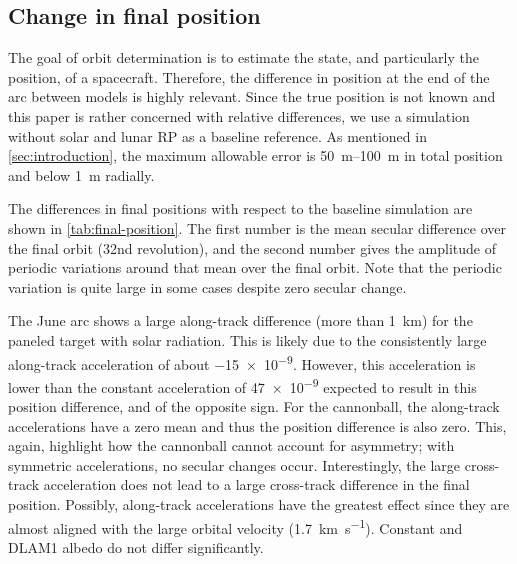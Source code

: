 \subsection{Change in final position}
The goal of orbit determination is to estimate the state, and particularly the position, of a spacecraft. Therefore, the difference in position at the end of the arc between models is highly relevant. Since the true position is not known and this paper is rather concerned with relative differences, we use a simulation without solar and lunar \gls{RP} as a baseline reference. As mentioned in \cref{sec:introduction}, the maximum allowable error is \qtyrange{50}{100}{\m} in total position and below \qty{1}{\m} radially.

\begin{table}[t]
    \caption{Difference of final position in \unit{\m} with respect to no-\gls{RP} baseline, given as mean over the final orbit plus/minus periodic variations around that mean in the final orbit. The largest changes are in the along-track position. $\mathbf{A}$: solar only; $\mathbf{B}$: lunar only (thermal + constant albedo); $\mathbf{C}$: lunar only (thermal + \gls{DLAM1} albedo); $\mathbf{D}$: solar + lunar (thermal + \gls{DLAM1} albedo).}
    \label{tab:final-position}
    \begin{subtable}[c]{\textwidth}
        
     \end{subtable}

     \medskip

     \begin{subtable}[c]{\textwidth}
        
     \end{subtable}
\end{table}

The differences in final positions with respect to the baseline simulation are shown in \cref{tab:final-position}. The first number is the mean secular difference over the final orbit (32nd revolution), and the second number gives the amplitude of periodic variations around that mean over the final orbit. Note that the periodic variation is quite large in some cases despite zero secular change.

The June arc shows a large along-track difference (more than \qty{1}{\km}) for the paneled target with solar radiation. This is likely due to the consistently large along-track acceleration of about \qty{-15e-9}{\acc}. However, this acceleration is lower than the constant acceleration of \qty{47e-9}{\acc} expected to result in this position difference, and of the opposite sign. For the cannonball, the along-track accelerations have a zero mean and thus the position difference is also zero. This, again, highlight how the cannonball cannot account for asymmetry; with symmetric accelerations, no secular changes occur. Interestingly, the large cross-track acceleration does not lead to a large cross-track difference in the final position. Possibly, along-track accelerations have the greatest effect since they are almost aligned with the large orbital velocity (\qty{1.7}{\km\per\s}). Constant and \gls{DLAM1} albedo do not differ significantly.

